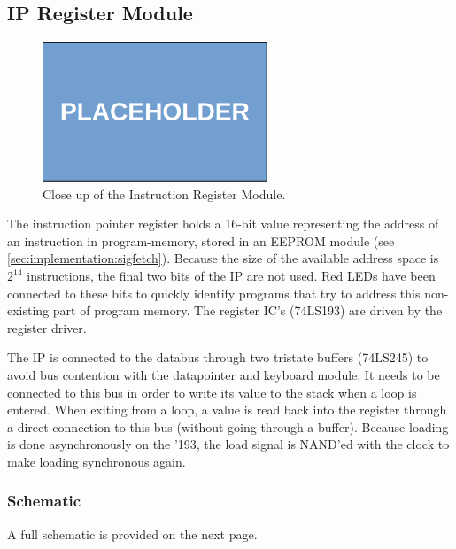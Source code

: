 
\subsection{IP Register Module}
\begin{figure}[H]
  \centering
  \includegraphics[width=0.6\textwidth]{img/placeholder}
  \caption{Close up of the Instruction Register Module.}
  \label{fig:iregcloseup}
\end{figure}

The instruction pointer register holds a 16-bit value representing the address of an instruction in program-memory, stored in an EEPROM module (see \ref{sec:implementation:sigfetch}). Because the size of the available address space is $2^{14}$ instructions, the final two bits of the IP are not used. Red LEDs have been connected to these bits to quickly identify programs that try to address this non-existing part of program memory. The register IC's (74LS193) are driven by the register driver.

The IP is connected to the databus through two tristate buffers (74LS245) to avoid bus contention with the datapointer and keyboard module. It needs to be connected to this bus in order to write its value to the stack when a loop is entered. When exiting from a loop, a value is read back into the register through a direct connection to this bus (without going through a buffer). Because loading is done asynchronously on the '193, the load signal is NAND'ed with the clock to make loading synchronous again.

\subsubsection{Schematic}
A full schematic is provided on the next page.



